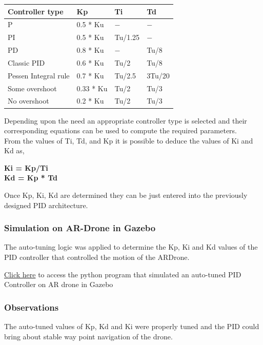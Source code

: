 \documentclass[a4paper,12pt,oneside]{book}
\begin{document}
\begin{tabular}{|p{10em}|p{8em}|p{4em}|p{4em}|}\hline
		\textbf{Controller type} & \textbf{Kp} &\textbf{Ti} & \textbf{Td}\\\hline
		P  & 0.5 * Ku & $-$ & $-$\\\hline
			PI & 0.5 * Ku & Tu/1.25 & $-$\\\hline
PD & 0.8 * Ku & $-$ & Tu/8 \\\hline
Classic PID & 0.6 * Ku & Tu/2 & Tu/8\\\hline
	Pessen Integral rule & 0.7 * Ku & Tu/2.5 & 3Tu/20 \\\hline
Some overshoot & 0.33 * Ku & Tu/2 & Tu/3\\\hline
No overshoot & 0.2 * Ku & Tu/2 & Tu/3\\\hline

\end{tabular}
\vspace{1em}


Depending upon the need an appropriate controller type is selected and their corresponding equations can be used to compute the required parameters.\\
From the values of Ti, Td, and Kp it is possible to deduce the values of 
Ki and Kd as,
\begin{center}
    \textbf{Ki = Kp/Ti}\\
    \textbf{Kd = Kp * Td}
\end{center} 
\vspace{1em}
Once Kp, Ki, Kd are determined they can be just entered into the previously designed PID architecture.


\subsubsection{Simulation on AR-Drone in Gazebo}
The auto-tuning logic was applied to determine the Kp, Ki and Kd values of the PID controller that controlled the motion of the ARDrone.

\href{https://github.com/eYSIP-2018/Autotuning-of-Controller-For-Drone/blob/karthik/auto-ar.py}{Click here} to access the python program that simulated an auto-tuned PID Controller on AR drone in Gazebo\\

\subsubsection{Observations}
The auto-tuned values of Kp, Kd and Ki were properly tuned and the PID could bring about stable way point navigation of the drone.\\
\end{document}
